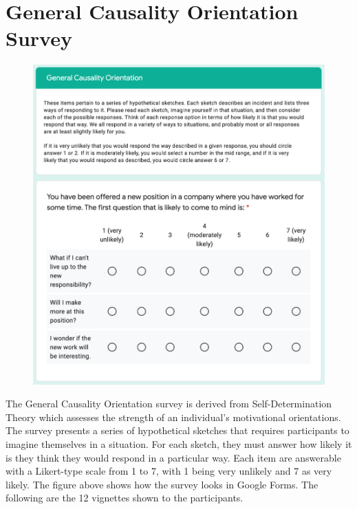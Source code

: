 \section{General Causality Orientation Survey}
\begin{figure}[h]
  \centering
  \includegraphics[scale=0.6]{figures/d-gcos.png}
\end{figure}
The General Causality Orientation survey is derived from Self-Determination Theory\cite{Deci1985GCOS} which assesses the strength of an individual's motivational orientations. The survey presents a series of hypothetical sketches that requires participants to imagine themselves in a situation. For each sketch, they must answer how likely it is they think they would respond in a particular way. Each item are answerable with a Likert-type scale from 1 to 7, with 1 being very unlikely and 7 as very likely. The figure above shows how the survey looks in Google Forms. The following are the 12 vignettes shown to the participants.

